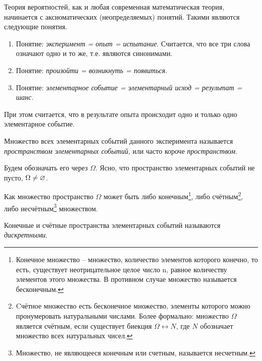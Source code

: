 

Теория вероятностей, как и любая современная математическая теория,
начинается с аксиоматических (неопределяемых) понятий. Такими являются
следующие понятия.
\begin{enumerate}
	\item Понятие: \textit{эксперимент = опыт = испытание}. Считается, что все три
слова означают одно и то же, т.е. являются синонимами.
	\item Понятие: \textit{произойти = возникнуть = появиться}.
	\item Понятие: \textit{элементарное событие = элементарный исход = результат
= шанс}.
\end{enumerate}

При этом считается, что в результате опыта происходит одно и только
одно элементарное событие.

\begin{definition}
	\label{def:2.1}
	Множество всех элементарных событий данного эксперимента называется \textit{пространством элементарных событий}, или часто короче \textit{пространством}.
\end{definition}

Будем обозначать его через $\Omega$. 
Ясно, что пространство элементарных событий не пусто, $\Omega\ne\varnothing$.

Как множество пространство $\Omega$ может быть либо конечным\footnote{Конечное множество -- множество, количество элементов которого конечно, то есть, существует неотрицательное целое число n, равное количеству элементов этого множества. В противном случае множество
называется бесконечным.}, 
либо счётным\footnote{Cчётное множество есть бесконечное множество, элементы которого можно пронумеровать натуральными числами. Более формально: множество $\Omega$ является счётным, если существует биекция $\Omega\leftrightarrow N$, где $N$ обозначает множество всех натуральных чисел.}, 
либо несчётным\footnote{Множество, не являющееся конечным или счетным, называется несчетным.} множеством.

\begin{definition}
	\label{def:2.2}
	Конечные и счётные пространства элементарных событий называются \textit{дискретными}.
\end{definition}

